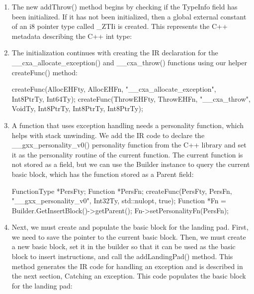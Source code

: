 \begin{enumerate}
\item
The new addThrow() method begins by checking if the TypeInfo field has been initialized. If it has not been initialized, then a global external constant of an i8 pointer type called \_ZTIi is created. This represents the C++ metadata describing the C++ int type:

\begin{cpp}
void addThrow(int PayloadVal) {
    if (!TypeInfo) {
        TypeInfo = new GlobalVariable(
        *M, Int8PtrTy,
        /*isConstant=*/true,
        GlobalValue::ExternalLinkage,
        /*Initializer=*/nullptr, "_ZTIi");
\end{cpp}

\item
The initialization continues with creating the IR declaration for the \_\_cxa\_allocate\_exception() and \_\_cxa\_throw() functions using our helper createFunc() method:

\begin{cpp}
        createFunc(AllocEHFty, AllocEHFn,
                "__cxa_allocate_exception", Int8PtrTy,
                {Int64Ty});
        createFunc(ThrowEHFty, ThrowEHFn, "__cxa_throw",
                VoidTy,
                {Int8PtrTy, Int8PtrTy, Int8PtrTy});
\end{cpp}

\item
A function that uses exception handling needs a personality function, which helps with stack unwinding. We add the IR code to declare the \_\_gxx\_personality\_v0() personality function from the C++ library and set it as the personality routine of the current function. The current function is not stored as a field, but we can use the Builder instance to query the current basic block, which has the function stored as a Parent field:

\begin{cpp}
        FunctionType *PersFty;
        Function *PersFn;
        createFunc(PersFty, PersFn,
                    "__gxx_personality_v0", Int32Ty, std::nulopt,
                    true);
        Function *Fn =
        Builder.GetInsertBlock()->getParent();
        Fn->setPersonalityFn(PersFn);
\end{cpp}

\item
Next, we must create and populate the basic block for the landing pad. First, we need to save the pointer to the current basic block. Then, we must create a new basic block, set it in the builder so that it can be used as the basic block to insert instructions, and call the addLandingPad() method. This method generates the IR code for handling an exception and is described in the next section, Catching an exception. This code populates the basic block for the landing pad:


\end{enumerate}
